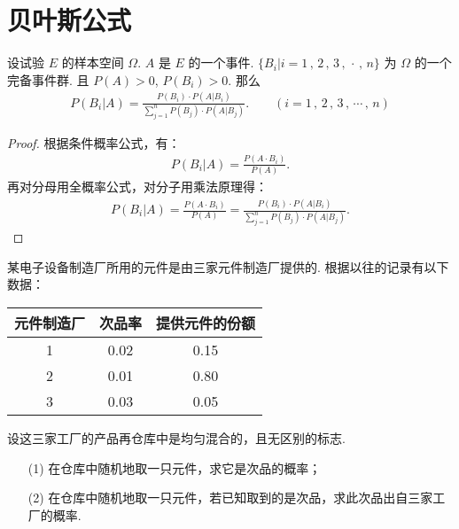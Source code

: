 \documentclass[12pt, a4paper, oneside, UTF8]{ctexbook}
\begin{document}
\section{贝叶斯公式}

\begin{thm}
    设试验 \(E\) 的样本空间 \(\Omega\). \(A\) 是 \(E\) 的一个事件. \(\{B_i | i = 1\,,\,2\,,\,3\,,\,\cdot\,,\,n\}\) 为 \(\Omega\) 的一个完备事件群. 且 \(P\left(A\right) > 0\), \(P\left(B_i\right) > 0\). 那么
    \begin{align*}
        P\left(B_i | A\right) = \frac{P\left(B_i\right) \cdot P\left(A | B_i\right)}{\sum_{j = 1}^{n}P\left(B_j\right) \cdot P\left(A | B_j\right)}. \qquad \left(i = 1\,,\,2\,,\,3\,,\,\cdots\,,\,n\right)
    \end{align*}
\end{thm}

\begin{proof}
    根据条件概率公式，有：
    \begin{align*}
        P\left(B_i | A\right) = \frac{P\left(A\cdot B_i\right)}{P\left(A\right)}.
    \end{align*}
    再对分母用全概率公式，对分子用乘法原理得：
    \begin{align*}
        P\left(B_i | A\right) = \frac{P\left(A\cdot B_i\right)}{P\left(A\right)} = \frac{P\left(B_i\right) \cdot P\left(A | B_i\right)}{\sum_{j = 1}^{n}P\left(B_j\right) \cdot P\left(A | B_j\right)}.
    \end{align*}
\end{proof}

\clearpage

\begin{example}
    某电子设备制造厂所用的元件是由三家元件制造厂提供的. 根据以往的记录有以下数据：
    \begin{table*}[h]
        \centering
        \renewcommand\arraystretch{1}
        \setlength{\tabcolsep}{15mm}
        \begin{tabular}[h]{c|c|c}
            \hline
            元件制造厂 & 次品率 & 提供元件的份额 \\ \hline
            1 & 0.02 & 0.15 \\ 
            2 & 0.01 & 0.80 \\ 
            3 & 0.03 & 0.05 \\ 
            \hline
        \end{tabular}
    \end{table*}

    设这三家工厂的产品再仓库中是均匀混合的，且无区别的标志. 
    \begin{enumerate}
        \item[(1)] 在仓库中随机地取一只元件，求它是次品的概率；
        \item[(2)] 在仓库中随机地取一只元件，若已知取到的是次品，求此次品出自三家工厂的概率.
    \end{enumerate}
\end{example}
\end{document}

